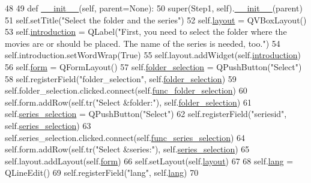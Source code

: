 \begin{DoxyCode}
48 
49     \textcolor{keyword}{def }\hyperlink{classmovies2hdd_1_1gui_1_1_step1_a7f77eb118cf3ec7debd009cdcedacb8f}{\_\_init\_\_}(self, parent=None):
50         super(Step1, self).\hyperlink{classmovies2hdd_1_1gui_1_1_step1_a7f77eb118cf3ec7debd009cdcedacb8f}{\_\_init\_\_}(parent)
51         self.setTitle(\textcolor{stringliteral}{"Select the folder and the series"})
52         self.\hyperlink{classmovies2hdd_1_1gui_1_1_step1_ac872defae6a2ec8fa87724017327180f}{layout} = QVBoxLayout()
53         self.\hyperlink{classmovies2hdd_1_1gui_1_1_step1_a682a18695266e8fecbd3df9151f76e4a}{introduction} = QLabel(\textcolor{stringliteral}{"First, you need to select the folder where the movies are
       or should be placed. The name of the series is needed, too."})
54         self.introduction.setWordWrap(\textcolor{keyword}{True})
55         self.layout.addWidget(self.\hyperlink{classmovies2hdd_1_1gui_1_1_step1_a682a18695266e8fecbd3df9151f76e4a}{introduction})
56         self.\hyperlink{classmovies2hdd_1_1gui_1_1_step1_adef1bafe9ac90f458d6ef9597b3248b9}{form} = QFormLayout()
57         self.\hyperlink{classmovies2hdd_1_1gui_1_1_step1_a88c314f92883ddbe7c73ef89f7925929}{folder\_selection} = QPushButton(\textcolor{stringliteral}{"Select"})
58         self.registerField(\textcolor{stringliteral}{"folder\_selection"}, self.\hyperlink{classmovies2hdd_1_1gui_1_1_step1_a88c314f92883ddbe7c73ef89f7925929}{folder\_selection})
59         self.folder\_selection.clicked.connect(self.\hyperlink{classmovies2hdd_1_1gui_1_1_step1_a3268d2a740327b03b1af10c02ae6e10e}{func\_folder\_selection})
60         self.form.addRow(self.tr(\textcolor{stringliteral}{"Select &folder:"}), self.\hyperlink{classmovies2hdd_1_1gui_1_1_step1_a88c314f92883ddbe7c73ef89f7925929}{folder\_selection})
61         self.\hyperlink{classmovies2hdd_1_1gui_1_1_step1_a7de4eabf338df8f4e5ebad68f8235d78}{series\_selection} = QPushButton(\textcolor{stringliteral}{"Select"})
62         self.registerField(\textcolor{stringliteral}{"seriesid"}, self.\hyperlink{classmovies2hdd_1_1gui_1_1_step1_a7de4eabf338df8f4e5ebad68f8235d78}{series\_selection})
63         self.series\_selection.clicked.connect(self.\hyperlink{classmovies2hdd_1_1gui_1_1_step1_a93e5715186ec42ee18c1c5a0f75c54c4}{func\_series\_selection})
64         self.form.addRow(self.tr(\textcolor{stringliteral}{"Select &series:"}), self.\hyperlink{classmovies2hdd_1_1gui_1_1_step1_a7de4eabf338df8f4e5ebad68f8235d78}{series\_selection})
65         self.layout.addLayout(self.\hyperlink{classmovies2hdd_1_1gui_1_1_step1_adef1bafe9ac90f458d6ef9597b3248b9}{form})
66         self.setLayout(self.\hyperlink{classmovies2hdd_1_1gui_1_1_step1_ac872defae6a2ec8fa87724017327180f}{layout})
67 
68         self.\hyperlink{classmovies2hdd_1_1gui_1_1_step1_abd8a0c304da63971d4941db343634d11}{lang} = QLineEdit()
69         self.registerField(\textcolor{stringliteral}{"lang"}, self.\hyperlink{classmovies2hdd_1_1gui_1_1_step1_abd8a0c304da63971d4941db343634d11}{lang})
70 

\end{DoxyCode}


